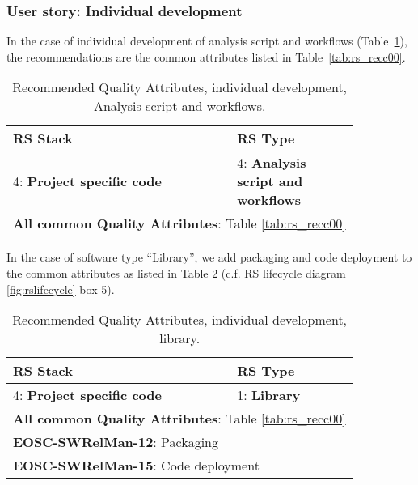\subsubsection{User story: Individual development}

In the case of individual development of analysis script and workflows (Table~\ref{tab:rs_recc01}), the recommendations are the common attributes listed in Table~\ref{tab:rs_recc00}.

\begin{table}[h]
  \centering
  \scriptsize
  \begin{tabular}{|p{0.55\linewidth}|p{0.3\linewidth}|} \hline

    \textbf{RS Stack} & \textbf{RS Type} \\ \hline \hline
    4: \textbf{Project specific code} & 4: \textbf{Analysis script and workflows} \\ \hline
    \multicolumn{2}{|l|}{\textbf{All common Quality Attributes}: Table \ref{tab:rs_recc00}} \\ \hline

  \end{tabular}
  \caption{Recommended Quality Attributes, individual development, Analysis script and workflows.}
  \label{tab:rs_recc01}
\end{table}

In the case of software type ``Library'', we add packaging and code deployment to the common attributes as listed in Table \ref{tab:rs_recc02} (c.f. RS lifecycle diagram \ref{fig:rslifecycle} box 5).

\begin{table}[h]
  \centering
  \scriptsize
  \begin{tabular}{|p{0.55\linewidth}|p{0.3\linewidth}|} \hline

    \textbf{RS Stack} & \textbf{RS Type} \\ \hline \hline
    4: \textbf{Project specific code} & 1: \textbf{Library} \\ \hline
    \multicolumn{2}{|l|}{\textbf{All common Quality Attributes}: Table \ref{tab:rs_recc00}} \\ \hline
    \multicolumn{2}{|l|}{\textbf{EOSC-SWRelMan-12}: Packaging} \\ \hline
    \multicolumn{2}{|l|}{\textbf{EOSC-SWRelMan-15}: Code deployment} \\ \hline

  \end{tabular}
  \caption{Recommended Quality Attributes, individual development, library.}
  \label{tab:rs_recc02}
\end{table}

